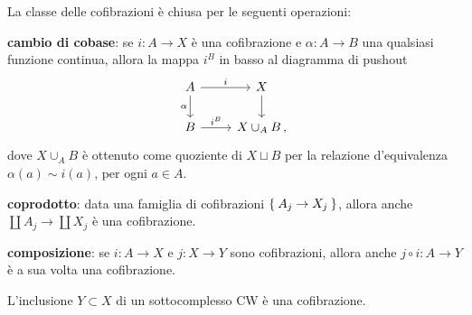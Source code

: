 \begin{exercise}
	La classe delle cofibrazioni è chiusa per le seguenti operazioni:
	\begin{rmnumerate}
		\item \textbf{cambio di cobase}: se $i: A \to X$ è una cofibrazione
		e $\alpha:A \to B$ una qualsiasi funzione continua, allora
		la mappa $i^{B}$ in basso al diagramma di pushout
		\begin{equation*}
			\begin{tikzcd}
			A \ar[r,"i"] \ar[d, "\alpha"'] & X \ar[d] \\
			B \ar[r, "i^{B}"] & X \cup_{A} B\,,  
			\end{tikzcd}
		\end{equation*}
		dove $X \cup_{A} B$ è ottenuto come quoziente di $X \sqcup B$
		per la relazione d'equivalenza $\alpha(a) \sim i(a)$, per ogni $a \in A$.
		
		\item \textbf{coprodotto}: data una famiglia di cofibrazioni 
		$\Set{A_{j} \to X_{j}}$, allora anche $\coprod A_{j} \to \coprod X_{j}$
		è una cofibrazione.
		
		\item \textbf{composizione}: se $i:A \to X$ e $j:X \to Y$ sono
		cofibrazioni, allora anche $j \circ i:A \to Y$ è a sua volta una cofibrazione.
		
	\end{rmnumerate}
\end{exercise}

\begin{ex}
	L'inclusione $Y \subset X$ di un sottocomplesso CW è una cofibrazione.
\end{ex}

